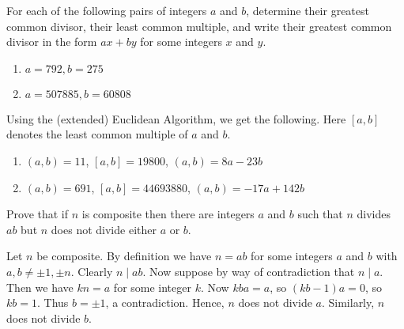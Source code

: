 \def\thetitle{Homework 1}



\begin{questions}

\question
  For each of the following pairs of integers \(a\) and \(b\), determine their greatest common divisor, their least common multiple, and write their greatest common divisor in the form \(a x+b y\) for some integers \(x\) and \(y\).
  \begin{enumerate}[label=(\alph*)]
    \item \(a=792, b=275\)
    \item \(a=507885, b=60808\)
  \end{enumerate} 

\begin{solution} Using the (extended) Euclidean Algorithm, we get the following. Here \([a,b]\) denotes the least common multiple of \(a\) and \(b\).
    \begin{enumerate}[label=(\alph*)]
        \item \((a,b) = 11\), \([a,b] = 19800\), \((a,b)= 8a - 23b\)
        \item \((a,b) = 691\), \([a,b] = 44693880\), \((a,b)= -17a +142b\)
    \end{enumerate}
\end{solution}


\question
    Prove that if \({n}\) is composite then there are integers \(a\) and \(b\) such that \(n\) divides \(a b\) but \(n\) does not divide either \(a\) or \(b\).

\begin{solution}
    Let \(n\) be composite. By definition we have \(n=a b\) for some integers \(a\) and \(b\) with \(a, b \neq \pm 1, \pm n\). Clearly \(n \mid a b\). Now suppose by way of contradiction that \(n \mid a\). Then we have \(k n=a\) for some integer \(k\). Now \(k b a=a\), so \((k b-1) a=0\), so \(k b=1\). Thus \(b= \pm 1\), a contradiction. Hence,  \(n\) does not divide \(a\). Similarly, \(n\) does not divide \(b\).
\end{solution}


\end{questions}
